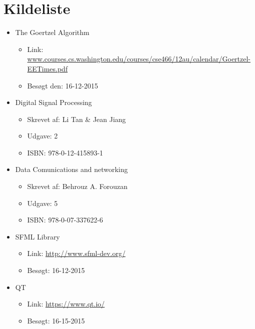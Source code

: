 \section{Kildeliste}

\begin{itemize}[noitemsep]
  \item The Goertzel Algorithm
  \begin{itemize}[noitemsep]
    \item Link: \url{www.courses.cs.washington.edu/courses/cse466/12au/calendar/Goertzel-EETimes.pdf}
    \item Besøgt den: 16-12-2015 
  \end{itemize}
  
  \item Digital Signal Processing
  \begin{itemize}[noitemsep]
  	\item Skrevet af: Li Tan \& Jean Jiang
  	\item Udgave: 2
  	\item ISBN: 978-0-12-415893-1
  \end{itemize}
  
   \item Data Comunications and networking
	\begin{itemize} [noitemsep]
	\item Skrevet af: Behrouz A. Forouzan
  	\item Udgave: 5
  	\item ISBN: 978-0-07-337622-6
\end{itemize}
  
  \item SFML Library
  \begin{itemize}[noitemsep]
    \item Link: \url{http://www.sfml-dev.org/}
    \item Besøgt: 16-12-2015
  \end{itemize}
  
  \item QT
	\begin{itemize} [noitemsep]
	\item Link: \url{https://www.qt.io/}
	\item Besøgt: 16-15-2015
\end{itemize}


 
\end{itemize}



